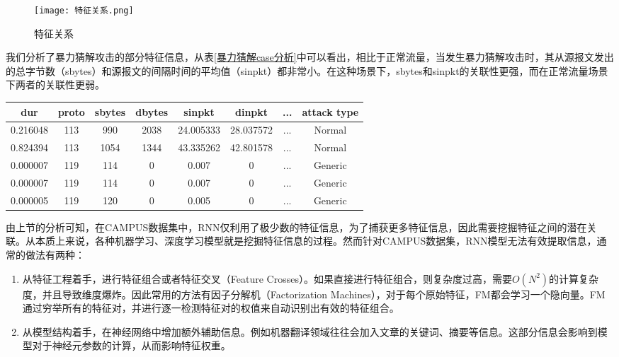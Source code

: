 \begin{figure}
  \centering
  \texttt{[image: 特征关系.png]}
  \caption{特征关系}
  \label{fig:特征关系}
\end{figure}

我们分析了暴力猜解攻击的部分特征信息，从表\ref{暴力猜解case分析}中可以看出，相比于正常流量，当发生暴力猜解攻击时，其从源报文发出的总字节数（sbytes）和源报文的间隔时间的平均值（sinpkt）都非常小。在这种场景下，sbytes和sinpkt的关联性更强，而在正常流量场景下两者的关联性更弱。

\begin{table*}[h]
  \small
  \caption{暴力猜解case分析}
  \label{暴力猜解case分析}
  \centering
  \begin{tabular}{cccccccc}
  \toprule
  dur & proto & sbytes & dbytes & sinpkt & dinpkt & ... & attack type \\
  \midrule
  0.216048 &	113	&990	&2038	&24.005333	&28.037572 & ... & Normal\\
  0.824394	&113	&1054	&1344	&43.335262	&42.801578 & ... & Normal\\
  0.000007	&119	&114	&0	&0.007	&0 & ... & Generic\\
  0.000007	&119	&114	&0	&0.007	&0 & ... & Generic\\
  0.000005	&119	&120	&0	&0.005	&0 & ... & Generic\\
  
   \bottomrule
  
  \end{tabular}
  \end{table*}
  

由上节的分析可知，在CAMPUS数据集中，RNN仅利用了极少数的特征信息，为了捕获更多特征信息，因此需要挖掘特征之间的潜在关联。从本质上来说，各种机器学习、深度学习模型就是挖掘特征信息的过程。然而针对CAMPUS数据集，RNN模型无法有效提取信息，通常的做法有两种：
\begin{enumerate}
  \item 从特征工程着手，进行特征组合或者特征交叉（Feature Crosses）。如果直接进行特征组合，则复杂度过高，需要$O(N^2)$的计算复杂度，并且导致维度爆炸。因此常用的方法有因子分解机（Factorization Machines），对于每个原始特征，FM都会学习一个隐向量。FM通过穷举所有的特征对，并进行逐一检测特征对的权值来自动识别出有效的特征组合。
  \item 从模型结构着手，在神经网络中增加额外辅助信息。例如机器翻译领域往往会加入文章的关键词、摘要等信息。这部分信息会影响到模型对于神经元参数的计算，从而影响特征权重。
\end{enumerate}

